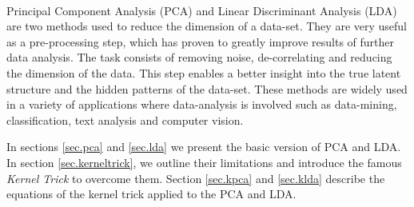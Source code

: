 \paragraph{}
Principal Component Analysis (PCA) and Linear Discriminant Analysis (LDA) are two methods used to
reduce the dimension of a data-set. They are very useful as a pre-processing step, which has proven
to greatly improve results of further data analysis. The task consists of removing noise,
de-correlating and reducing the dimension of the data. This step enables a better insight into
the true latent structure and the hidden patterns of the data-set. These methods are widely used in a
variety of applications where data-analysis is involved such as data-mining, classification, text
analysis and computer vision.

In sections \ref{sec.pca} and \ref{sec.lda} we present the basic version of PCA and LDA. In section
\ref{sec.kerneltrick}, we outline their limitations and introduce the famous \emph{Kernel Trick} to
overcome them. Section \ref{sec.kpca} and \ref{sec.klda} describe the equations of the kernel trick
applied to the PCA and LDA.
